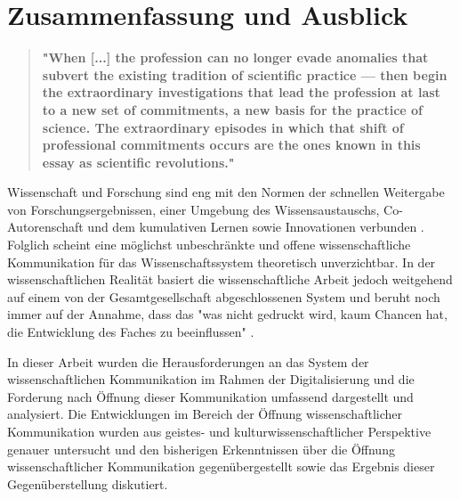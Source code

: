 \chapter{Zusammenfassung und Ausblick}

\begin{quote}
\textbf{"When [...] the profession can no longer evade anomalies that subvert the existing tradition of scientific practice — then begin the extraordinary investigations that lead the profession at last to a new set of commitments, a new basis for the practice of science. The extraordinary episodes in which that shift of professional commitments occurs are the ones known in this essay as scientific revolutions."}
\end{quote} \cite[:6]{Kuhn_2012}

Wissenschaft und Forschung sind eng mit den Normen der schnellen Weitergabe von Forschungsergebnissen, einer Umgebung des Wissensaustauschs, Co-Autorenschaft und dem kumulativen Lernen sowie Innovationen verbunden \cite{Partha_1994}. Folglich scheint eine möglichst unbeschränkte und offene wissenschaftliche Kommunikation für das Wissenschaftssystem theoretisch unverzichtbar. In der wissenschaftlichen Realität basiert die wissenschaftliche Arbeit jedoch weitgehend auf einem von der Gesamtgesellschaft abgeschlossenen System und beruht noch immer auf der Annahme, dass das "was nicht gedruckt wird, kaum Chancen hat, die Entwicklung des Faches zu beeinflussen" \cite{Luhmann_1997}.

In dieser Arbeit wurden die Herausforderungen an das System der wissenschaftlichen Kommunikation im Rahmen der Digitalisierung und die Forderung nach Öffnung dieser Kommunikation umfassend dargestellt und analysiert. Die Entwicklungen im Bereich der Öffnung wissenschaftlicher Kommunikation wurden aus geistes- und kulturwissenschaftlicher Perspektive genauer untersucht und den bisherigen Erkenntnissen über die Öffnung wissenschaftlicher Kommunikation gegenübergestellt sowie das Ergebnis dieser Gegenüberstellung diskutiert.

